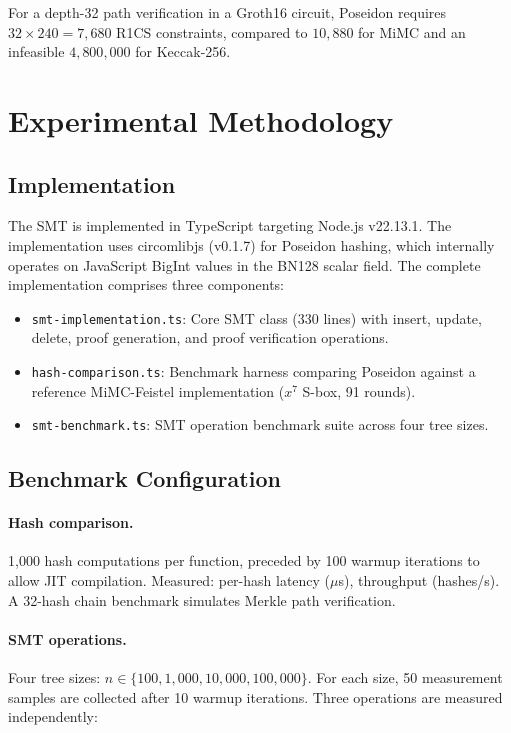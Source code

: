 For a depth-32 path verification in a Groth16 circuit, Poseidon requires $32 \times 240 = 7{,}680$ R1CS constraints, compared to $10{,}880$ for MiMC and an infeasible $4{,}800{,}000$ for Keccak-256.

\section{Experimental Methodology}
\label{sec:methodology}

\subsection{Implementation}

The SMT is implemented in TypeScript targeting Node.js v22.13.1. The implementation uses circomlibjs (v0.1.7) for Poseidon hashing, which internally operates on JavaScript BigInt values in the BN128 scalar field. The complete implementation comprises three components:

\begin{itemize}
  \item \texttt{smt-implementation.ts}: Core SMT class (330 lines) with insert, update, delete, proof generation, and proof verification operations.
  \item \texttt{hash-comparison.ts}: Benchmark harness comparing Poseidon against a reference MiMC-Feistel implementation ($x^7$ S-box, 91 rounds).
  \item \texttt{smt-benchmark.ts}: SMT operation benchmark suite across four tree sizes.
\end{itemize}

\subsection{Benchmark Configuration}

\paragraph{Hash comparison.} 1{,}000 hash computations per function, preceded by 100 warmup iterations to allow JIT compilation. Measured: per-hash latency ($\mu$s), throughput (hashes/s). A 32-hash chain benchmark simulates Merkle path verification.

\paragraph{SMT operations.} Four tree sizes: $n \in \{100, 1{,}000, 10{,}000, 100{,}000\}$. For each size, 50 measurement samples are collected after 10 warmup iterations. Three operations are measured independently:

